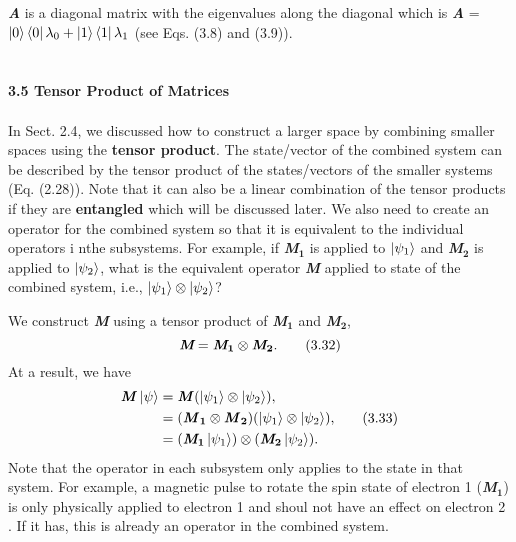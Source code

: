 \documentclass{article}
\begin{document}
\textit{\textbf{A}} is a diagonal matrix with the eigenvalues along the diagonal which is 
\textit{\textbf{A}} = $\ket{0}\bra{0}\lambda_0+\ket{1}\bra{1}\lambda_1$ (see Eqs. (3.8) and (3.9)).
\\\\\\
\textbf{\Large 3.5 Tensor Product of Matrices}\\\\
In Sect. 2.4, we discussed how to construct a larger space by combining smaller
spaces using the \textbf{tensor product}. The state/vector of the combined system can be described by the tensor product
of the states/vectors of the smaller systems (Eq. (2.28)). Note that it can also be a linear
combination of the tensor products if they are \textbf{entangled} which will be discussed later.
We also need to create an operator for the combined system so that it is equivalent to the individual
operators i nthe subsystems. For example, if \textit{\textbf{M$_\textbf{1}$}} is applied to $\ket{\psi_1}$ and 
\textit{\textbf{M$_\textbf{2}$}} is applied to $\ket{\psi_2}$, what is the equivalent operator
\textit{\textbf{M}} applied to state of the combined system, i.e., $\ket{\psi_1}\otimes\ket{\psi_2}$?

We construct \textit{\textbf{M}} using a tensor product of \textit{\textbf{M$_\textbf{1}$}} and \textit{\textbf{M$_\textbf{2}$}},
\begin{equation} \label{eq 3.32}
   \textit{\textbf{M}}=\textit{\textbf{M}}_{\textbf{1}}\otimes\textit{\textbf{M}}_{\textbf{2}}. \tag{3.32}
\end{equation} 
At a result, we have
\begin{align} \label{eq 3.33}
    \begin{split}
        \textbf{\textit{M}}\ket{\psi}&=\textbf{\textit{M}}(\ket{\psi_1}\otimes\ket{\psi_2}),\\
        &=(\textbf{\textit{M}}_{\textbf{1}}\otimes\textbf{\textit{M}}_{\textbf{2}})(\ket{\psi_1}\otimes\ket{\psi_2}),\\
        &=(\textit{\textbf{M}}_{\textbf{1}}\ket{\psi_1})\otimes(\textit{\textbf{M}}_{\textbf{2}}\ket{\psi_2}).
    \end{split} \tag{3.33}
\end{align}
Note that the operator in each subsystem only applies to the state in that system.
For example, a magnetic pulse to rotate the spin state of electron 1 (\textit{\textbf{M}}$_{\textbf{1}}$) is only physically
applied to electron 1 and shoul not have an effect on electron 2 . If it has,
this is already an operator in the combined system.
\end{document}
